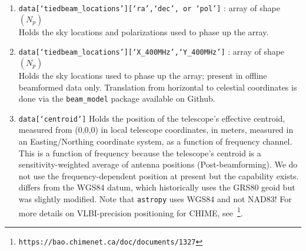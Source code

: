 \begin{enumerate}
    \item \texttt{data[`tiedbeam\_locations'][`ra',`dec', or `pol']} : array of shape $(N_p)$\\
    Holds the sky locations and polarizations used to phase up the array.
    \item \texttt{data[`tiedbeam\_locations'][`X\_400MHz',`Y\_400MHz']} : array of shape $(N_p)$\\
    Holds the sky locations used to phase up the array; present in offline beamformed data only. Translation from horizontal to celestial coordinates is done via the \texttt{beam\_model} package available on Github.
    \item \texttt{data[`centroid']} Holds the position of the telescope's effective centroid, measured from (0,0,0) in local telescope coordinates, in meters,  measured in an Easting/Northing coordinate system, as a function of frequency channel. This is a function of frequency because the telescope's centroid is a sensitivity-weighted average of antenna positions (Post-beamforming). We do not use the frequency-dependent position at present but the capability exists.
        differs from the WGS84 datum, which historically uses the GRS80 geoid but was slightly modified. Note that \texttt{astropy} uses WGS84 and not NAD83! For more details on VLBI-precision positioning for CHIME, see~\footnote{\texttt{https://bao.chimenet.ca/doc/documents/1327}}.
\end{enumerate}


